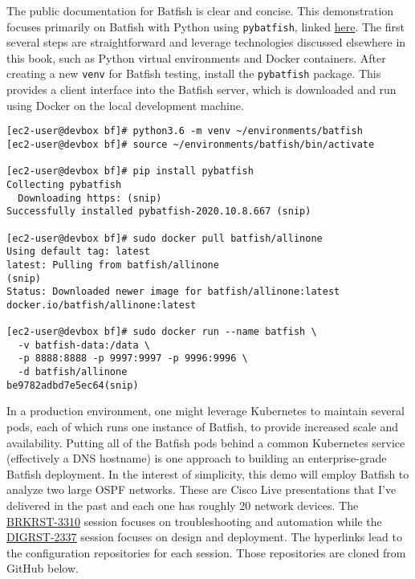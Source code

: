 The public documentation for Batfish is clear and concise. This demonstration
focuses primarily on Batfish with Python using \verb|pybatfish|, linked
\href{https://pybatfish.readthedocs.io/en/latest/}{here}. The first several
steps are straightforward and leverage technologies discussed elsewhere in
this book, such as Python virtual environments and Docker containers. After
creating a new \verb|venv| for Batfish testing, install the \verb|pybatfish|
package. This provides a client interface into the Batfish server, which is
downloaded and run using Docker on the local development machine.

\begin{verbatim}
[ec2-user@devbox bf]# python3.6 -m venv ~/environments/batfish
[ec2-user@devbox bf]# source ~/environments/batfish/bin/activate

[ec2-user@devbox bf]# pip install pybatfish
Collecting pybatfish
  Downloading https: (snip)
Successfully installed pybatfish-2020.10.8.667 (snip)

[ec2-user@devbox bf]# sudo docker pull batfish/allinone
Using default tag: latest
latest: Pulling from batfish/allinone
(snip)
Status: Downloaded newer image for batfish/allinone:latest
docker.io/batfish/allinone:latest

[ec2-user@devbox bf]# sudo docker run --name batfish \
  -v batfish-data:/data \
  -p 8888:8888 -p 9997:9997 -p 9996:9996 \
  -d batfish/allinone
be9782adbd7e5ec64(snip)
\end{verbatim}

In a production environment, one might leverage Kubernetes to maintain
several pods, each of which runs one instance of Batfish, to provide
increased scale and availability. Putting all of the Batfish pods behind
a common Kubernetes service (effectively a DNS hostname) is one approach
to building an enterprise-grade Batfish deployment. In the interest
of simplicity, this demo will employ Batfish to analyze two large OSPF
networks. These are Cisco Live presentations that I've delivered in the
past and each one has roughly 20 network devices. The
\href{https://github.com/nickrusso42518/ospf_brkrst3310}{BRKRST-3310}
session focuses on troubleshooting and automation while the
\href{https://github.com/nickrusso42518/ospf_digrst2337}{DIGRST-2337}
session focuses on design and deployment. The hyperlinks lead to the
configuration repositories for each session. Those repositories are
cloned from GitHub below.

